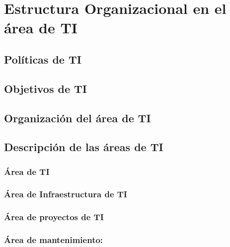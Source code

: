 \section{Estructura Organizacional en el área de TI}


\subsection{Políticas de TI}
\lipsum[1]

\subsection{Objetivos de TI}
\lipsum[1]
\subsection{Organización del área de TI}
\lipsum[1]


\subsection{Descripción de las áreas de TI}
\subsubsection{Área de TI}
\subsubsection{Área de Infraestructura de TI}
\lipsum[1]
\subsubsection{Área de proyectos de TI}
\lipsum[1]
\subsubsection{Área de mantenimiento: }

